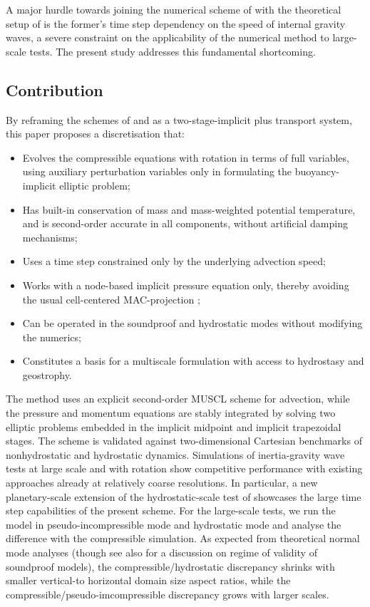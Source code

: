 \documentclass{ametsoc}
\theoremstyle{definition}
\begin{document}
A major hurdle towards joining the numerical scheme of \cite{BenacchioEtAl2014} with the theoretical setup of \cite{KleinBenacchio2016} is the former's time step dependency on the speed of internal gravity waves, a severe constraint on the applicability of the numerical method to large-scale tests. The present study addresses this fundamental shortcoming. 

\subsection{Contribution}

By reframing the schemes of \cite{KleinTCFD2009} and \cite{BenacchioEtAl2014} as a two-stage-implicit plus transport system, this paper proposes a discretisation that:
%
\begin{itemize}
\item Evolves the compressible equations with rotation in terms of full variables, using auxiliary perturbation variables only in formulating the buoyancy-implicit elliptic problem;
\item Has built-in conservation of mass and mass-weighted potential temperature, and is second-order accurate in all components, without artificial damping mechanisms;
\item Uses a time step constrained only by the underlying advection speed;
\item Works with a node-based implicit pressure equation only, thereby avoiding the usual cell-centered MAC-projection \citep[see][and references therein]{AlmgrenEtAl1998}; 
\item Can be operated in the soundproof and hydrostatic modes without modifying the numerics;
\item Constitutes a basis for a multiscale formulation with access to hydrostasy and geostrophy.
\end{itemize}

The method uses an explicit second-order MUSCL scheme for advection, while the pressure and momentum equations are stably integrated by solving two elliptic problems embedded in the implicit midpoint and implicit trapezoidal stages. The scheme is validated against two-dimensional Cartesian benchmarks of nonhydrostatic and hydrostatic dynamics. Simulations of inertia-gravity wave tests at large scale and with rotation show competitive performance with existing approaches already at relatively coarse resolutions. In particular, a new planetary-scale extension of the hydrostatic-scale test of \cite{SkamarockKlemp1994} showcases the large time step capabilities of the present scheme. For the large-scale tests, we run the model in pseudo-incompressible mode and hydrostatic mode and analyse the difference with the compressible simulation. As expected from theoretical normal mode analyses \citep{DaviesEtAl2003, Dukowicz2013} (though see also \cite{KleinEtAl2010} for a discussion on regime of validity of soundproof models), the compressible/hydrostatic discrepancy shrinks with smaller vertical-to horizontal domain size aspect ratios, while the compressible/pseudo-imcompressible discrepancy grows with larger scales.
\end{document}
